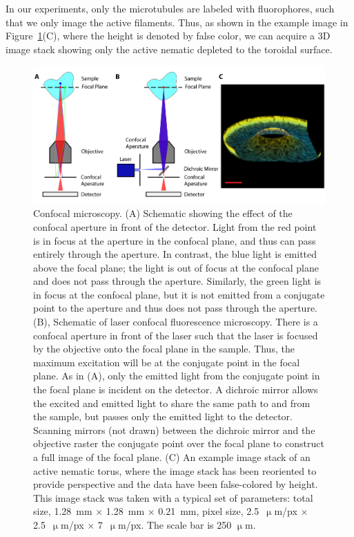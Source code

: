 In our experiments, only the microtubules are labeled with fluorophores, such that we only image the active filaments.
Thus, as shown in the example image in Figure~\ref{f:3-Confocal}(C), where the height is denoted by false color, we can acquire a 3D image stack showing only the active nematic depleted to the toroidal surface.
\begin{figure}
  \centering
  \includegraphics{figures/C3/Ch3-Figs_Confocal.png}
  \caption{Confocal microscopy.
  (A) Schematic showing the effect of the confocal aperture in front of the detector.
  Light from the red point is in focus at the aperture in the confocal plane, and thus can pass entirely through the aperture.
  In contrast, the blue light is emitted above the focal plane; the light is out of focus at the confocal plane and does not pass through the aperture.
  Similarly, the green light is in focus at the confocal plane, but it is not emitted from a conjugate point to the aperture and thus does not pass through the aperture.
  (B), Schematic of laser confocal fluorescence microscopy.
  There is a confocal aperture in front of the laser such that the laser is focused by the objective onto the focal plane in the sample.
  Thus, the maximum excitation will be at the conjugate point in the focal plane.
  As in (A), only the emitted light from the conjugate point in the focal plane is incident on the detector.
  A dichroic mirror allows the excited and emitted light to share the same path to and from the sample, but passes only the emitted light to the detector.
  Scanning mirrors (not drawn) between the dichroic mirror and the objective raster the conjugate point over the focal plane to construct a full image of the focal plane.
  (C) An example image stack of an active nematic torus, where the image stack has been reoriented to provide perspective and the data have been false-colored by height.
  This image stack was taken with a typical set of parameters: total size, 1.28~mm $\times$ 1.28~mm $\times$ 0.21~mm, pixel size, 2.5~$\upmu$m/px $\times$ 2.5~$\upmu$m/px $\times$ 7~$\upmu$m/px.
  The scale bar is 250 $\upmu$m.}\label{f:3-Confocal}
\end{figure}

